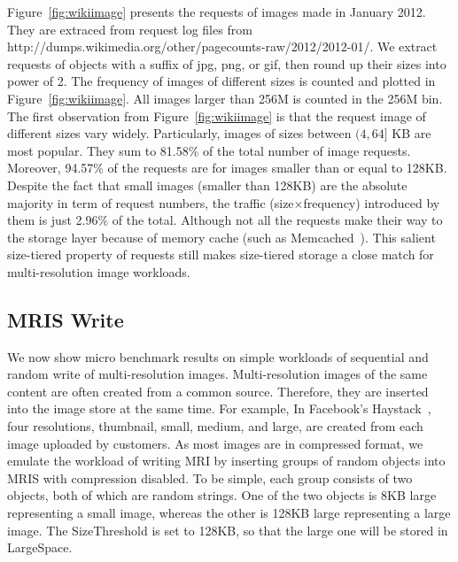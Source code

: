 Figure~\ref{fig:wikiimage} presents the requests of images made in
January 2012. They are extraced from request log files from
http://dumps.wikimedia.org/other/pagecounts-raw/2012/2012-01/. We
extract requests of objects with a suffix of jpg, png, or gif, then
round up their sizes into power of 2. The frequency of images of
different sizes is counted and plotted in Figure~\ref{fig:wikiimage}.
All images larger than 256M is counted in the 256M bin. The first
observation from Figure~\ref{fig:wikiimage} is that the request image
of different sizes vary widely.  Particularly, images of sizes between
$(4, 64]$ KB are most popular. They sum to 81.58\% of the total number
of image requests. Moreover, 94.57\% of the requests are for images
smaller than or equal to 128KB. Despite the fact that small images
(smaller than 128KB) are the absolute majority in term of request
numbers, the traffic (size$\times$frequency) introduced by them is
just 2.96\% of the total. Although not all the requests make their way
to the storage layer because of memory cache (such as
Memcached~\cite{memcached}).  This salient size-tiered property of
requests still makes size-tiered storage a close match for
multi-resolution image workloads.

\subsection{MRIS Write}



We now show micro benchmark results on simple workloads of sequential
and random write of multi-resolution images. Multi-resolution images
of the same content are often created from a common source. Therefore,
they are inserted into the image store at the same time. For example,
In Facebook's Haystack~\cite{beaver2010finding}, four resolutions,
thumbnail, small, medium, and large, are created from each image
uploaded by customers. As most images are in compressed format, we
emulate the workload of writing MRI by inserting groups of random
objects into MRIS with compression disabled. To be simple, each group
consists of two objects, both of which are random strings. One of the
two objects is 8KB large representing a small image, whereas the other
is 128KB large representing a large image. The SizeThreshold is set to
128KB, so that the large one will be stored in LargeSpace.


